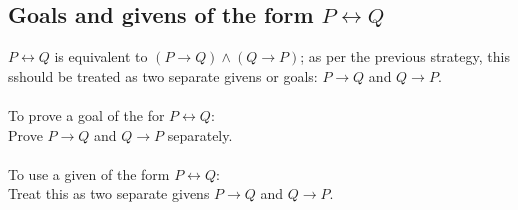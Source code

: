 \documentclass{report}
\theoremstyle{definition}
\begin{document}
\subsection{Goals and givens of the form $P\leftrightarrow Q$}
$P\leftrightarrow Q$ is equivalent to $(P\to Q)\land(Q\to P)$; as per the previous strategy, this sshould be treated as two separate givens or goals: $P\to Q$ and $Q\to P$.\\
\vspace{1mm}\\
\indent To prove a goal of the for $P\leftrightarrow Q$:\\
\indent Prove $P\to Q$ and $Q\to P$ separately.\\
\vspace{1mm}\\
\indent To use a given of the form $P\leftrightarrow Q$:\\
\indent Treat this as two separate givens $P\to Q$ and $Q\to P$.
\end{document}
